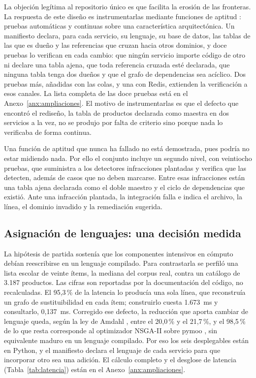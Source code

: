 La objeción legítima al repositorio único es que facilita la erosión de las fronteras. La
respuesta de este diseño es instrumentarlas mediante funciones de aptitud
\citep{ford_building_2017}: pruebas automáticas y continuas sobre una característica
arquitectónica. Un manifiesto declara, para cada servicio, su lenguaje, su base de datos, las tablas de las que es
dueño y las referencias que cruzan hacia otros dominios, y doce pruebas lo verifican en cada
cambio: que ningún servicio importe código de otro ni declare una tabla ajena, que toda referencia
cruzada esté declarada, que ninguna tabla tenga dos dueños y que el grafo de dependencias sea
acíclico. Dos pruebas más, añadidas con las colas, y una con Redis, extienden la verificación a
esos canales. La lista completa de las doce pruebas está en el Anexo~\ref{anx:ampliaciones}.
El motivo de instrumentarlas es que el defecto que encontró el rediseño, la tabla de productos
declarada como maestra en dos servicios a la vez, no se produjo por falta de criterio sino porque
nada lo verificaba de forma continua.

Una función de aptitud que nunca ha fallado no está demostrada, pues podría no estar
midiendo nada. Por ello el conjunto incluye un segundo nivel, con veintiocho pruebas, que
suministra a los detectores infracciones plantadas y verifica que las detecten, además de
casos que no deben marcarse. Entre esas infracciones están una tabla ajena declarada como
el doble maestro y el ciclo de dependencias que existió. Ante una infracción plantada, la
integración falla e indica el archivo, la línea, el dominio invadido y la remediación
sugerida.

\subsection{Asignación de lenguajes: una decisión medida}
\label{sec:lenguajes}

La hipótesis de partida sostenía que los componentes intensivos en cómputo debían reescribirse en
un lenguaje compilado. Para contrastarla se perfiló una lista escolar de veinte ítems, la mediana
del corpus real, contra un catálogo de 3.187 productos. Las cifras son reportadas por la
documentación del código, no recalculadas. El 95,3\,\% de la latencia lo producía una sola línea,
que reconstruía un grafo de sustituibilidad en cada ítem; construirlo cuesta 1.673~ms y consultarlo,
0,137~ms. Corregido ese defecto, la reducción que aporta cambiar de lenguaje queda, según la ley de
Amdahl \citep{amdahl_validity_1967}, entre el 20,0\,\% y el 21,7\,\%, y el 98,5\,\% de lo que
resta corresponde al optimizador NSGA-II sobre pymoo \citep{blank_pymoo_2020}, sin equivalente
maduro en un lenguaje compilado. Por eso los seis desplegables están en Python, y el manifiesto
declara el lenguaje de cada servicio para que incorporar otro sea una adición. El cálculo
completo y el desglose de latencia (Tabla~\ref{tab:latencia}) están en el
Anexo~\ref{anx:ampliaciones}.

